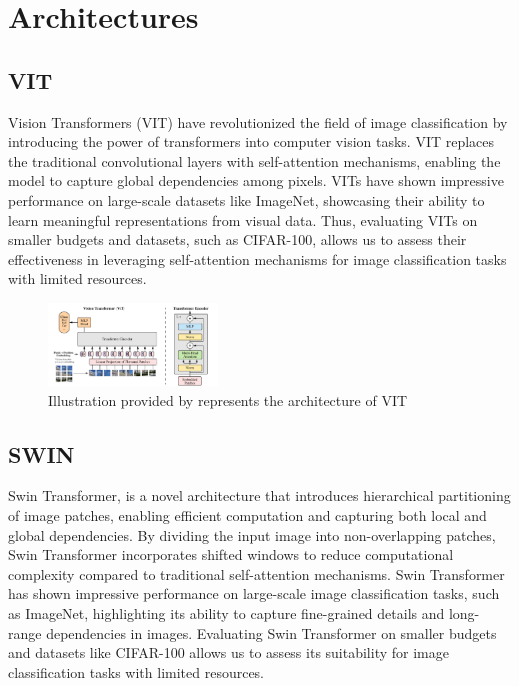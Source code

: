\documentclass{article}
\begin{document}
\section{Architectures}

\subsection{VIT}
Vision Transformers (VIT) have revolutionized the field of image classification by introducing the power of transformers into computer vision tasks.
VIT replaces the traditional convolutional layers with self-attention mechanisms, enabling the model to capture global dependencies among pixels. VITs have shown impressive performance on large-scale datasets like ImageNet, showcasing their ability to learn meaningful representations from visual data. Thus, evaluating VITs on smaller budgets and datasets, such as CIFAR-100, allows us to assess their effectiveness in leveraging self-attention mechanisms for image classification tasks with limited resources.

\begin{figure}[ht]
    \vskip 0.2in
    \centering
    \includegraphics[width=0.4\textwidth]{vit.png}
    \caption{Illustration provided by \cite{DBLP:journals/corr/abs-2010-11929} represents the architecture of VIT}
    \label{fig:foobar}
    \vskip -0.2in
\end{figure}

\subsection{SWIN}
Swin Transformer, is a novel architecture that introduces hierarchical partitioning of image patches, enabling efficient computation and capturing both local and global dependencies. By dividing the input image into non-overlapping patches, Swin Transformer incorporates shifted windows to reduce computational complexity compared to traditional self-attention mechanisms. Swin Transformer has shown impressive performance on large-scale image classification tasks, such as ImageNet, highlighting its ability to capture fine-grained details and long-range dependencies in images. Evaluating Swin Transformer on smaller budgets and datasets like CIFAR-100 allows us to assess its suitability for image classification tasks with limited resources.
\end{document}
